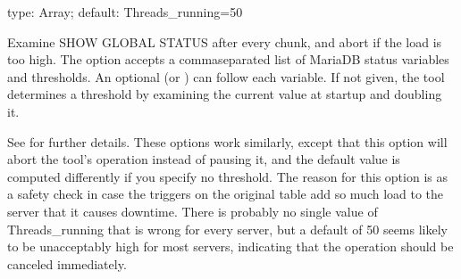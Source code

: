 \documentclass[letterpaper,10pt,english]{sphinxmanual}
\begin{document}

\begin{fulllineitems}
\label{\detokenize{mariadb-schema-change:cmdoption-mariadb-schema-change-critical-load}}
\sphinxAtStartPar
type: Array; default: Threads\_running=50

\sphinxAtStartPar
Examine SHOW GLOBAL STATUS after every chunk, and abort if the load is too high.
The option accepts a comma\sphinxhyphen{}separated list of MariaDB status variables and
thresholds.  An optional  (or ) can follow each
variable.  If not given, the tool determines a threshold by examining the
current value at startup and doubling it.

\sphinxAtStartPar
See {\hyperref[\detokenize{mariadb-schema-change:cmdoption-mariadb-schema-change-max-load}]{}} for further details. These options work similarly, except
that this option will abort the tool’s operation instead of pausing it, and the
default value is computed differently if you specify no threshold.  The reason
for this option is as a safety check in case the triggers on the original table
add so much load to the server that it causes downtime.  There is probably no
single value of Threads\_running that is wrong for every server, but a default of
50 seems likely to be unacceptably high for most servers, indicating that the
operation should be canceled immediately.

\end{fulllineitems}

\end{document}
